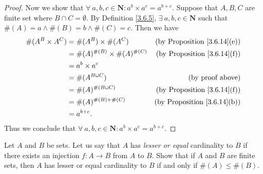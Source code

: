 \begin{proof}
    Now we show that \(\forall\ a, b, c \in \mathbf{N} : a^b \times a^c = a^{b + c}\).
    Suppose that \(A, B, C\) are finite set where \(B \cap C = \emptyset\).
    By Definition \ref{3.6.5}, \(\exists\ a, b, c \in \mathbf{N}\) such that \(\#(A) = a \land \#(B) = b \land \#(C) = c\).
    Then we have
    \begin{align*}
        \#(A^B \times A^C) & = \#(A^B) \times \#(A^C)             & \text{(by Proposition \ref{3.6.14}(e))} \\
                           & = \#(A)^{\#(B)} \times \#(A)^{\#(C)} & \text{(by Proposition \ref{3.6.14}(f))} \\
                           & = a^b \times a^c                                                               \\
                           & = \#(A^{B \cup C})                   & \text{(by proof above)}                 \\
                           & = \#(A)^{\#(B \cup C)}               & \text{(by Proposition \ref{3.6.14}(f))} \\
                           & = \#(A)^{\#(B) + \#(C)}              & \text{(by Proposition \ref{3.6.14}(b))} \\
                           & = a^{b + c}.
    \end{align*}
    Thus we conclude that \(\forall\ a, b, c \in \mathbf{N} : a^b \times a^c = a^{b + c}\).
\end{proof}

\begin{exercise}\label{ex 3.6.7}
    Let \(A\) and \(B\) be sets.
    Let us say that \(A\) has \emph{lesser or equal} cardinality to \(B\) if there exists an injection \(f : A \to B\) from \(A\) to \(B\).
    Show that if \(A\) and \(B\) are finite sets, then \(A\) has lesser or equal cardinality to \(B\) if and only if \(\#(A) \leq \#(B)\).
\end{exercise}

